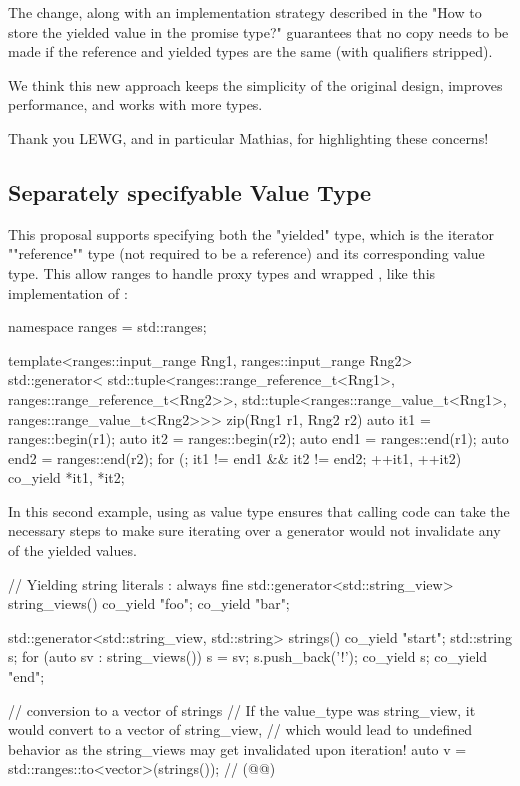 \documentclass{wg21}
\begin{document}
The change, along with an implementation strategy described in the "How to store the yielded value in the promise type?" guarantees that
no copy needs to be made if the reference and yielded types are the same (with qualifiers stripped).

We think this new approach keeps the simplicity of the original design, improves performance, and works with more types.

Thank you LEWG, and in particular Mathias, for highlighting these concerns!

\subsection{Separately specifyable Value Type}

This proposal supports specifying both the "yielded" type, which is the iterator ""reference"" type (not required to be a reference) and its corresponding value type.
This allow ranges to handle proxy types and wrapped , like this implementation of :

\begin{colorblock}
namespace ranges = std::ranges;

template<ranges::input_range Rng1, ranges::input_range Rng2>
std::generator<
    std::tuple<ranges::range_reference_t<Rng1>, ranges::range_reference_t<Rng2>>,
    std::tuple<ranges::range_value_t<Rng1>, ranges::range_value_t<Rng2>>>
zip(Rng1 r1, Rng2 r2) {
    auto it1 = ranges::begin(r1);
    auto it2 = ranges::begin(r2);
    auto end1 = ranges::end(r1);
    auto end2 = ranges::end(r2);
    for (; it1 != end1 && it2 != end2; ++it1, ++it2) {
        co_yield {*it1, *it2};
    }
}
\end{colorblock}

In this second example, using  as value type ensures that calling code can take the necessary steps
to make sure iterating over a generator would not invalidate any of the yielded values.

\begin{colorblock}
// Yielding string literals : always fine
std::generator<std::string_view> string_views() {
    co_yield "foo";
    co_yield "bar";
}

std::generator<std::string_view, std::string> strings() {
    co_yield "start";
    std::string s;
    for (auto sv : string_views()) {
        s = sv;
        s.push_back('!');
        co_yield s;
    }
    co_yield "end";
}

// conversion to a vector of strings
// If the value_type was string_view, it would convert to a vector of string_view,
// which would lead to undefined behavior as the string_views may get invalidated upon iteration!
auto v = std::ranges::to<vector>(strings()); // (@{}@)
\end{colorblock}
\end{document}
